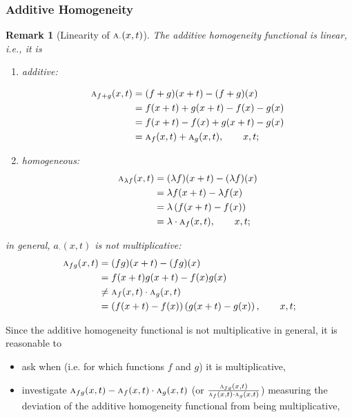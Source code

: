 \documentclass{amsart}
\makeatletter
\theoremstyle{plain}
\newtheorem{remark}{Remark}
\numberwithin{equation}{section}
\def\lambda{\Greekmath 0115 }%
\def\FindBoldGroup{%
   {\setbox0=\hbox{$\mathbf{x\global\edef\theboldgroup{\the\mathgroup}}$}}%
}
\def\Greekmath#1#2#3#4{%
    \if@compatibility
        \ifnum\mathgroup=\symbold
           \mathchoice{\mbox{\boldmath$\displaystyle\mathchar"#1#2#3#4$}}%
                      {\mbox{\boldmath$\textstyle\mathchar"#1#2#3#4$}}%
                      {\mbox{\boldmath$\scriptstyle\mathchar"#1#2#3#4$}}%
                      {\mbox{\boldmath$\scriptscriptstyle\mathchar"#1#2#3#4$}}%
        \else
           \mathchar"#1#2#3#4%
        \fi 
    \else 
        \FindBoldGroup
        \ifnum\mathgroup=\theboldgroup %
           \mathchoice{\mbox{\boldmath$\displaystyle\mathchar"#1#2#3#4$}}%
                      {\mbox{\boldmath$\textstyle\mathchar"#1#2#3#4$}}%
                      {\mbox{\boldmath$\scriptstyle\mathchar"#1#2#3#4$}}%
                      {\mbox{\boldmath$\scriptscriptstyle\mathchar"#1#2#3#4$}}%
        \else
           \mathchar"#1#2#3#4%
        \fi     	    
	  \fi}
\newcommand{\ah}{\textsc{a}}
\makeatother
\begin{document}
\subsubsection{Additive Homogeneity}
\begin{remark}[Linearity of $\ah_{\cdot}(x,t)$]
The additive homogeneity functional is linear, i.e., it is
\begin{enumerate}
    \item 
{additive}:

\begin{align*}
\ah_{f+g}(x,t) &=
({f+g})(x+t)-{(f+g)(x)}\\
&=
f(x+t)+g(x+t)-f(x)-g(x) \\
&=
f(x+t)-f(x) + g(x+t)-g(x)\\
&=
\ah_{f}(x,t) + \ah_{g}(x,t), \qquad x,t;
\end{align*}

   \item 
homogeneous:
\begin{align*}
\ah_{\lambda f}(x,t) &=
({\lambda f})(x+t)-{(\lambda f)(x)}\\
&=
\lambda f(x+t)-\lambda f(x) \\
&=
\lambda \left(f(x+t)- f(x) \right) \\
&=
\lambda \cdot \ah_{f}(x,t), \qquad x,t;
\end{align*}
\end{enumerate}
in general,
$a_{\cdot}(x,t)$ is not multiplicative:
\begin{align*}
\ah_{fg}(x,t) &=
({fg})(x+t)-{(fg)(x)}\\
&=
f(x+t) g(x+t)-f(x) g(x) \\
&\neq 
\ah_{f}(x,t) \cdot \ah_{g}(x,t)\\
&=
\left( {f(x+t)-f(x)} \right) \left( {g(x+t)-g(x)} \right), \qquad x,t;
\end{align*}
\end{remark}

Since the additive homogeneity functional is not multiplicative in general,
it is reasonable to 
\begin{itemize}
    \item 
ask when (i.e. for which functions $f$ and $g$) it is  multiplicative,
 \item 
 investigate $\ah_{fg}(x,t) - \ah_{f}(x,t) \cdot \ah_{g}(x,t)$
 (or  
 $\frac{\ah_{fg}(x,t)}{\ah_{f}(x,t) \cdot \ah_{g}(x,t)}$)
 measuring the deviation of the additive homogeneity functional from being multiplicative,

\end{itemize}
\end{document}
